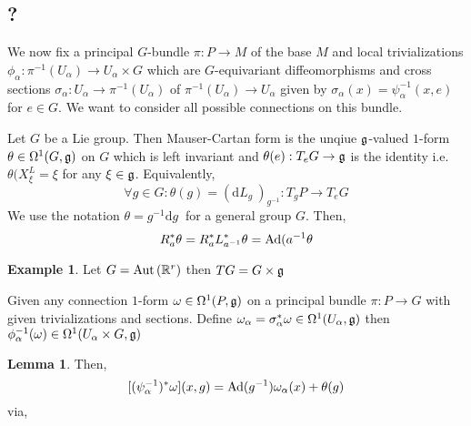 \documentclass[12pt]{extarticle}
\newcommand{\R}{\mathbb{R}}
\renewcommand{\d}[1]{ \mathrm{d}#1 \:}
\theoremstyle{definition}
\newtheorem{lemma}[theorem]{Lemma}
\newtheorem{example}[theorem]{Example}
\newenvironment{definition}[1][Definition:]{\begin{trivlist}
\item[\hskip \labelsep {\bfseries #1}]}{\end{trivlist}}
\begin{document}
\subsection{?}

We now fix a principal $G$-bundle $\pi : P \to M$ of the base $M$ and local trivializations $\phi_\alpha : \pi^{-1}(U_\alpha) \to U_\alpha \times G$ which are $G$-equivariant diffeomorphisms and cross sections $\sigma_\alpha  : U_\alpha \to \pi^{-1}(U_\alpha)$ of $\pi^{-1}(U_\alpha) \to U_\alpha$ given by $\sigma_\alpha(x) = \psi_\alpha^{-1}(x, e)$ for $e \in G$. We want to consider all possible connections on this bundle. 

\begin{definition}
Let $G$ be a Lie group. Then Mauser-Cartan form is the unqiue $\mathfrak{g}$-valued $1$-form $\theta \in \Omega^1(G, \mathfrak{g})$ on $G$ which is left invariant and $\theta(e) : T_e G \to \mathfrak{g}$ is the identity i.e. $\theta(X^L_\xi = \xi$ for any $\xi \in \mathfrak{g}$. Equivalently,
\[ \forall g \in G : \theta(g) = (\d{L_g})_{g^{-1}} : T_g P \to T_e G  \]
We use the notation $\theta = g^{-1} \d{g}$ for a general group $G$. Then,
\[ R_a^* \theta = R_a^* L_{a^{-1}}^* \theta = \mathrm{Ad}{(a^{-1}} \theta \]
\end{definition}

\begin{example}
Let $G = \Aut{\R^r}$ then $TG = G \times \mathfrak{g}$ 
\end{example}

\begin{definition}
Given any connection $1$-form $\omega \in \Omega^1(P, \mathfrak{g})$ on a principal bundle $\pi : P \to G$ with given trivializations and sections. Define $\omega_\alpha = \sigma_\alpha^* \omega \in \Omega^1(U_\alpha, \mathfrak{g})$ then $\phi_\alpha^{-1}(\omega) \in \Omega^1(U_\alpha \times G, \mathfrak{g})$
\end{definition}

\begin{lemma}
Then,
\[ [(\psi^{-1}_\alpha)^* \omega](x,g) = \mathrm{Ad}{(g^{-1})} \omega_\alpha(x) + \theta(g) \]
via,
\begin{center}
\end{center}
\end{lemma}
\end{document}
